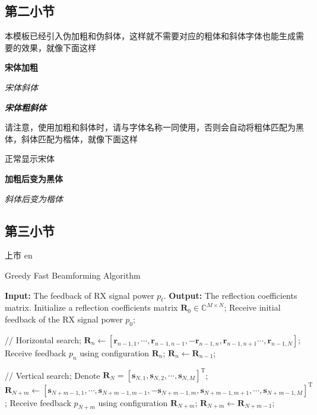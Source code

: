 \documentclass[supercite]{HustGraduPaper}
\begin{document}
\subsection{第二小节}
本模板已经引入伪加粗和伪斜体，这样就不需要对应的粗体和斜体字体也能生成需要的效果，就像下面这样

{\songti \bfseries 宋体加粗}

{\songti \itshape 宋体斜体}

{\songti \bfseries \itshape 宋体粗斜体}

请注意，使用加粗和斜体时，请与字体名称一同使用，否则会自动将粗体匹配为黑体，斜体匹配为楷体，就像下面这样

{正常显示宋体}

{\bfseries 加粗后变为黑体}

{\itshape 斜体后变为楷体}

\subsection{第三小节}


上市
en
\begin{algorithm}
	\caption{Greedy Fast Beamforming Algorithm}
	\label{alg:GreedyAlgorithm}
	\begin{algorithmic}[1]
		\STATE \textbf{Input: } The feedback of RX signal power $p_t$.
		\STATE \textbf{Output: } The reflection coefficients matrix.
		\STATE Initialize a reflection coefficients matrix $ \mathbf{R}_0\in \mathbb{C}^{M \times N }$;
		\STATE Receive initial feedback of the RX signal power $ p_0 $;

		\STATE // Horizontal search;
		\STATE  $ \mathbf{R}_{n} \leftarrow [\mathbf{r}_{n-1,1},\cdots,\mathbf{r}_{n-1,n-1},- \mathbf{r}_{n-1,n}, \mathbf{r}_{n-1,n+1}\cdots,\mathbf{r}_{n-1,N}] $;
		\STATE Receive feedback $ p_{n} $ using configuration $ \mathbf{R}_{n}$;
		\STATE $ \mathbf{R}_{n} \leftarrow \mathbf{R}_{n-1}$;
		\ENDIF
		\ENDFOR

		\STATE // Vertical search;
		\STATE Denote $ \mathbf{R}_{N} =[\mathbf{s}_{N,1},\mathbf{s}_{N,2},\cdots,\mathbf{s}_{N,M}]^\mathrm{T}$;
		\small
		\STATE  $\mathbf{R}_{N+m} \leftarrow [\mathbf{s}_{N+m-1,1},\cdots,\mathbf{s}_{N+m-1,m-1},- \mathbf{s}_{N+m-1,m}, \mathbf{s}_{N+m-1,m+1}, \cdots, \mathbf{s}_{N+m-1,M}]^\mathrm{T}$;
		\normalsize
		\STATE Receive feedback $ p_{N+m} $ using configuration $\mathbf{R}_{N+m}$;
		\STATE $ \mathbf{R}_{N+m} \leftarrow \mathbf{R}_{N+m-1}$;
		\ENDIF
		\ENDFOR
	\end{algorithmic}
\end{algorithm}
\end{document}
